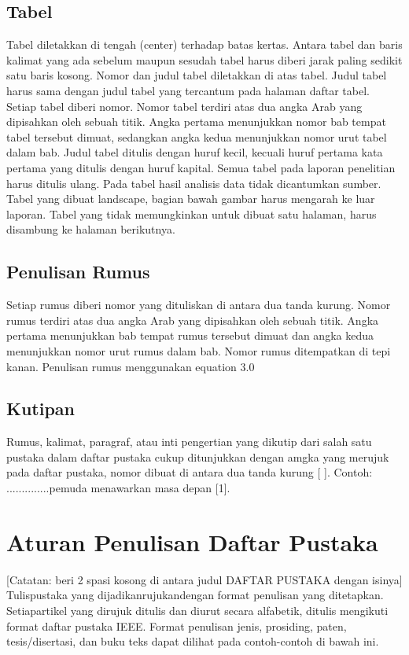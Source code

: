 \subsection{Tabel}
Tabel diletakkan di tengah (center) terhadap batas kertas. Antara tabel dan baris kalimat yang ada sebelum maupun sesudah tabel harus diberi jarak paling sedikit satu baris kosong. Nomor dan judul tabel diletakkan di atas tabel. Judul tabel harus sama dengan judul tabel yang tercantum pada halaman daftar tabel. Setiap tabel diberi nomor. Nomor tabel terdiri atas dua angka Arab yang dipisahkan oleh sebuah titik. Angka pertama menunjukkan nomor bab tempat tabel tersebut dimuat, sedangkan angka kedua menunjukkan nomor urut tabel dalam bab. Judul tabel ditulis dengan huruf kecil, kecuali huruf pertama kata pertama yang ditulis dengan huruf kapital. Semua tabel pada laporan penelitian harus ditulis ulang. Pada tabel hasil analisis data tidak dicantumkan sumber. Tabel yang dibuat landscape, bagian bawah gambar harus mengarah ke luar laporan. Tabel yang tidak memungkinkan untuk dibuat satu halaman, harus disambung ke halaman berikutnya.

\subsection{Penulisan Rumus}
Setiap rumus diberi nomor yang dituliskan di antara dua tanda kurung. Nomor rumus terdiri atas dua angka Arab yang dipisahkan oleh sebuah titik. Angka pertama menunjukkan bab tempat rumus tersebut dimuat dan angka kedua menunjukkan nomor urut rumus dalam bab. Nomor rumus ditempatkan di tepi kanan. Penulisan rumus menggunakan equation 3.0

\subsection{Kutipan}
Rumus, kalimat, paragraf, atau inti pengertian yang dikutip dari salah satu pustaka dalam daftar pustaka cukup ditunjukkan dengan amgka yang merujuk pada daftar pustaka, nomor dibuat di antara dua tanda kurung [ ]. Contoh: ..............pemuda menawarkan masa depan [1]. 

\section{Aturan Penulisan Daftar Pustaka}

[Catatan: beri 2 spasi kosong di antara judul DAFTAR PUSTAKA dengan isinya]
Tulispustaka yang dijadikanrujukandengan format penulisan yang ditetapkan. Setiapartikel yang dirujuk ditulis dan diurut secara alfabetik, ditulis mengikuti format daftar pustaka IEEE. Format penulisan jenis, prosiding, paten, tesis/disertasi, dan buku teks dapat dilihat pada contoh-contoh di bawah ini.

